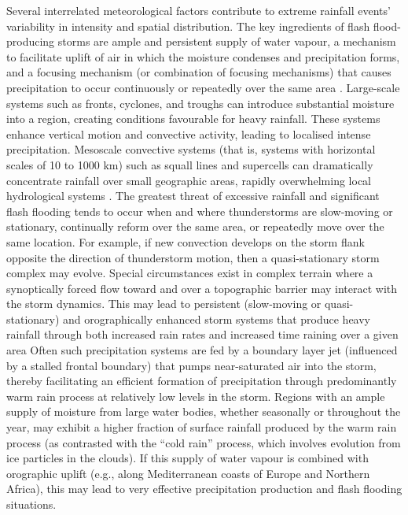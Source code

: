 Several interrelated meteorological factors contribute to extreme rainfall events’ variability in intensity and spatial distribution. The key ingredients of flash flood-producing storms are ample and persistent supply of water vapour, a mechanism to facilitate uplift of air in which the moisture condenses and precipitation forms, and a focusing mechanism (or combination of focusing mechanisms) that causes precipitation to occur continuously or repeatedly over the same area \citep{Doswell_1996}. Large-scale systems such as fronts, cyclones, and troughs can introduce substantial moisture into a region, creating conditions favourable for heavy rainfall. These systems enhance vertical motion and convective activity, leading to localised intense precipitation. Mesoscale convective systems (that is, systems with horizontal scales of 10 to 1000 km) such as squall lines and supercells can dramatically concentrate rainfall over small geographic areas, rapidly overwhelming local hydrological systems \citep{Maddox_1979, Doswell_1996, Davis_2001}. The greatest threat of excessive rainfall and significant flash flooding tends to occur when and where thunderstorms are slow-moving or stationary, continually reform over the same area, or repeatedly move over the same location. For example, if new convection develops on the storm flank opposite the direction of thunderstorm motion, then a quasi-stationary storm complex may evolve. Special circumstances exist in complex terrain where a synoptically forced flow toward and over a topographic barrier may interact with the storm dynamics. This may lead to persistent (slow-moving or quasi-stationary) and orographically enhanced storm systems that produce heavy rainfall through both increased rain rates and increased time raining over a given area Often such precipitation systems are fed by a boundary layer jet (influenced by a stalled frontal boundary) that pumps near-saturated air into the storm, thereby facilitating an efficient formation of precipitation through predominantly warm rain process at relatively low levels in the storm. Regions with an ample supply of moisture from large water bodies, whether seasonally or throughout the year, may exhibit a higher fraction of surface rainfall produced by the warm rain process (as contrasted with the “cold rain” process, which involves evolution from ice particles in the clouds). If this supply of water vapour is combined with orographic uplift (e.g., along Mediterranean coasts of Europe and Northern Africa), this may lead to very effective precipitation production and flash flooding situations.

